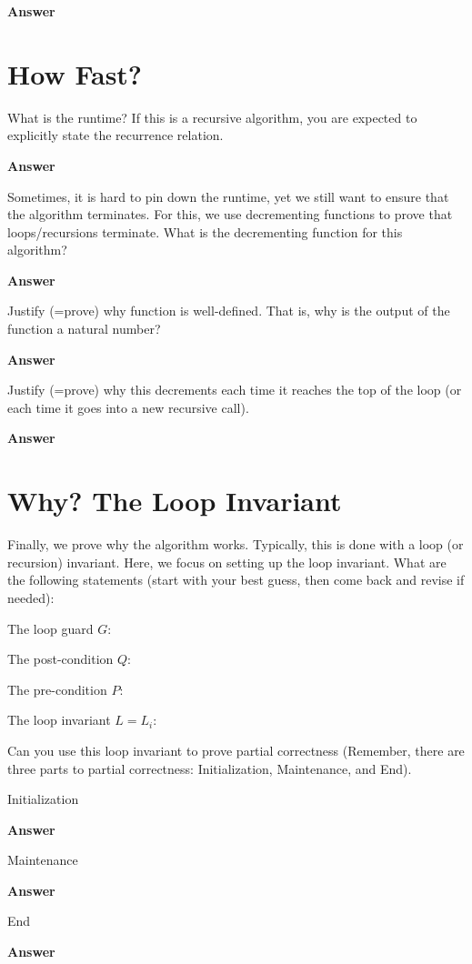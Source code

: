 \documentclass{article}
\begin{document}
\textbf{Answer}
\vspace{1in}

\section{How Fast?}

What is the runtime?  If this is a recursive algorithm, you are expected to
explicitly state the recurrence relation.

\textbf{Answer}
\vspace{1in}

Sometimes, it is hard to pin down the runtime, yet we still want to ensure that
the algorithm terminates.  For this, we use decrementing functions to prove that
loops/recursions terminate.
What is the decrementing function for this algorithm?

\textbf{Answer}
\vspace{1in}

Justify (=prove) why function is well-defined.  That is, why is the output of
the function a natural number?

\textbf{Answer}
\vspace{1in}

Justify (=prove) why this decrements each time it reaches the top of the loop
(or each time it goes into a new recursive call).

\textbf{Answer}
\vspace{1in}


\pagebreak
\section{Why? The Loop Invariant}

Finally, we prove why the algorithm works.  Typically, this is done with a loop
(or recursion) invariant.  Here, we focus on setting up the loop invariant.
What
are the following statements (start with your best guess, then come back and
revise if needed):

The loop guard $G$:
\vspace{0.5in}

The post-condition $Q$:
\vspace{0.5in}

The pre-condition $P$:
\vspace{0.5in}

The loop invariant $L=L_i$:
\vspace{0.5in}


Can you use this loop invariant
to prove partial correctness (Remember, there are three parts to partial
correctness: Initialization, Maintenance, and End).

Initialization

\textbf{Answer}
\vspace{1in}


Maintenance

\textbf{Answer}
\vspace{1in}


End

\textbf{Answer}
\vspace{1in}
\end{document}
